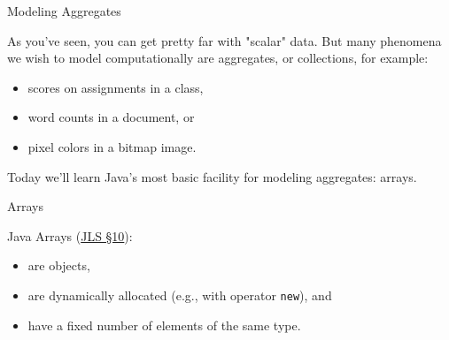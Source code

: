\documentclass{beamer}
\begin{document}
\begin{frame}
  \titlepage
\end{frame}


\begin{frame}[fragile]{Modeling Aggregates}


As you've seen, you can get pretty far with "scalar" data.  But many phenomena we wish to model computationally are aggregates, or collections, for example:
\begin{itemize}
\item scores on assignments in a class,
\item word counts in a document, or
\item pixel colors in a bitmap image.
\end{itemize}

Today we'll learn Java's most basic facility for modeling aggregates: arrays.

\end{frame}


\begin{frame}[fragile]{Arrays}


Java Arrays (\href{http://docs.oracle.com/javase/specs/jls/se8/html/jls-10.html}{JLS \S 10}):
\begin{itemize}
\item are objects,
\item are dynamically allocated (e.g., with operator {\tt new}), and
\item have a fixed number of elements of the same type.
\end{itemize}

\end{frame}
\end{document}
